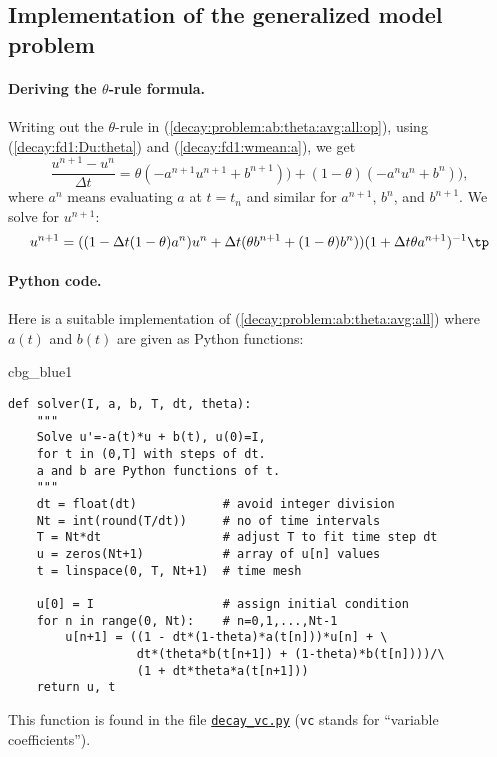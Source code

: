 \documentclass[graybox,sectrefs,envcountresetchap,open=right,final]{svmonodo}
\newenvironment{_cod_tight}[1]{
   \def\FrameCommand{\colorbox{#1}}
   \FrameRule0.6pt\MakeFramed {\FrameRestore}\vskip3mm}
   {\vskip0mm\endMakeFramed}
\newenvironment{cod}[1]{
\bgroup\rmfamily
\fboxsep=0mm\relax
\begin{_cod_tight}{#1}
\list{}{\parsep=-2mm\parskip=0mm\topsep=0pt\leftmargin=2mm
\rightmargin=2\leftmargin\leftmargin=4pt\relax}
\item\relax}
{\endlist\end{_cod_tight}\egroup}
\begin{document}
\subsection{Implementation of the generalized model problem}
\label{decay:general}

\paragraph{Deriving the $\theta$-rule formula.}
Writing out the $\theta$-rule in (\ref{decay:problem:ab:theta:avg:all:op}),
using (\ref{decay:fd1:Du:theta})
and (\ref{decay:fd1:wmean:a}), we get
\begin{equation}
\frac{u^{n+1}-u^n}{\Delta t} = \theta(-a^{n+1}u^{n+1} + b^{n+1}))
+ (1-\theta)(-a^nu^{n} + b^n)),
\label{decay:problem:ab:theta:avg:all}
\end{equation}
where $a^n$ means evaluating $a$ at $t=t_n$ and similar for
$a^{n+1}$, $b^n$, and $b^{n+1}$.
We solve for $u^{n+1}$:
\begin{equation}
u^{n+1} = ((1 - \Delta t(1-\theta)a^n)u^n
+ \Delta t(\theta b^{n+1} + (1-\theta)b^n))(1 + \Delta t\theta a^{n+1})^{-1}
\tp
\end{equation}

\paragraph{Python code.}
Here is a suitable implementation of (\ref{decay:problem:ab:theta:avg:all})
where $a(t)$ and $b(t)$ are given as
Python functions:

\begin{cod}{cbg_blue1}\begin{Verbatim}[numbers=none,fontsize=\fontsize{9pt}{9pt},baselinestretch=0.95,xleftmargin=2mm]
def solver(I, a, b, T, dt, theta):
    """
    Solve u'=-a(t)*u + b(t), u(0)=I,
    for t in (0,T] with steps of dt.
    a and b are Python functions of t.
    """
    dt = float(dt)            # avoid integer division
    Nt = int(round(T/dt))     # no of time intervals
    T = Nt*dt                 # adjust T to fit time step dt
    u = zeros(Nt+1)           # array of u[n] values
    t = linspace(0, T, Nt+1)  # time mesh

    u[0] = I                  # assign initial condition
    for n in range(0, Nt):    # n=0,1,...,Nt-1
        u[n+1] = ((1 - dt*(1-theta)*a(t[n]))*u[n] + \ 
                  dt*(theta*b(t[n+1]) + (1-theta)*b(t[n])))/\ 
                  (1 + dt*theta*a(t[n+1]))
    return u, t
\end{Verbatim}
\end{cod}
\noindent
This function is found in the file \href{{http://tinyurl.com/ofkw6kc/genz/decay_vc.py}}{\nolinkurl{decay_vc.py}} (\texttt{vc} stands for ``variable coefficients'').
\end{document}
